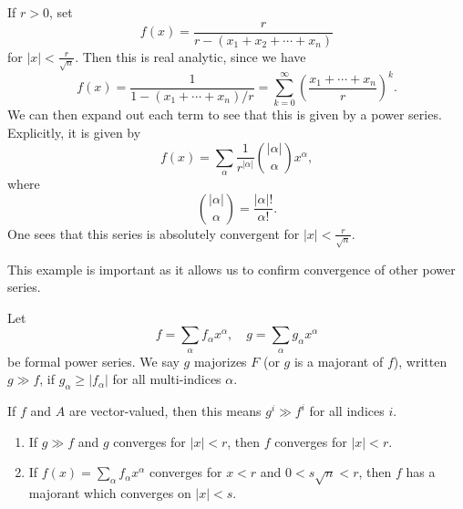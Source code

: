 \documentclass[a4paper]{article}
\begin{document}
\begin{eg}
  If $r > 0$, set
  \[
    f(x) = \frac{r}{r - (x_1 + x_2 + \cdots + x_n)}
  \]
  for $|x| < \frac{r}{\sqrt{n}}$. Then this is real analytic, since we have
  \[
    f(x) = \frac{1}{1 - (x_1 + \cdots + x_n)/r} = \sum_{k = 0}^\infty \left(\frac{x_1 + \cdots + x_n}{r}\right)^k.
  \]
  We can then expand out each term to see that this is given by a power series. Explicitly, it is given by
  \[
    f(x) = \sum_\alpha \frac{1}{r^{|\alpha|}}\binom{|\alpha|}{\alpha} x^\alpha,
  \]
  where
  \[
    \binom{|\alpha|}{\alpha} = \frac{|\alpha|!}{\alpha!}.
  \]
  One sees that this series is absolutely convergent for $|x| < \frac{r}{\sqrt{n}}$.
\end{eg}
This example is important as it allows us to confirm convergence of other power series.

\begin{defi}[Majorant]
  Let
  \[
    f = \sum_\alpha f_\alpha x^\alpha,\quad g = \sum_\alpha g_\alpha x^\alpha
  \]
  be formal power series. We say $g$ majorizes $F$ (or $g$ is a majorant of $f$), written $g \gg f$, if $g_\alpha \geq |f_\alpha|$ for all multi-indices $\alpha$.

  If $f$ and $A$ are vector-valued, then this means $g^i \gg f^i$ for all indices $i$.
\end{defi}

\begin{lemma}\leavevmode
  \begin{enumerate}
    \item If $g \gg f$ and $g$ converges for $|x| < r$, then $f$ converges for $|x| < r$.
    \item If $f(x) = \sum_\alpha f_\alpha x^\alpha$ converges for $x < r$ and $0 < s\sqrt{n} < r$, then $f$ has a majorant which converges on $|x| < s$. %
  \end{enumerate}
\end{lemma}
\end{document}
